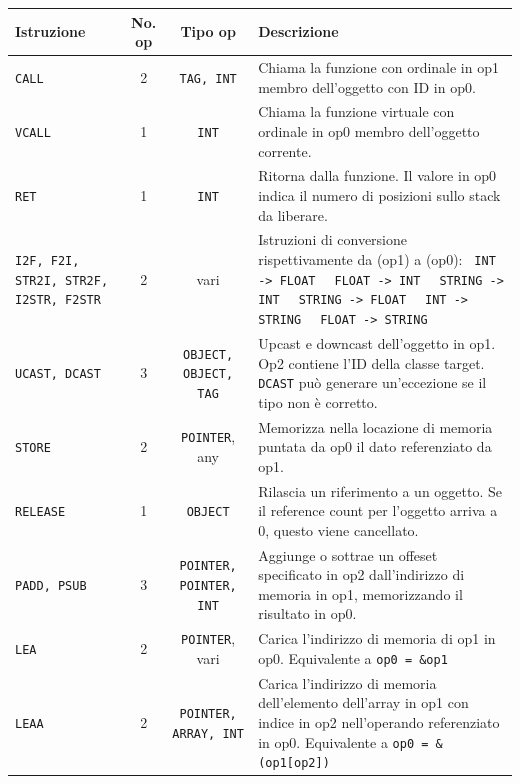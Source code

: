 \documentclass[a4paper, 11pt]{article}
\newcommand{\code}[1]{\scriptsize{\texttt{#1}}\normalsize}
\begin{document}
\begin{center}
\begin{tabular}{p{2.2 cm}|c|c|p{5.5 cm}}
\hline

\textbf{Istruzione} & \textbf{No. op} & \textbf{Tipo op} & \textbf{Descrizione}\\
\hline


\code{CALL} & 2 & \code{TAG, INT} & \footnotesize{Chiama la funzione con ordinale in op1 membro dell'oggetto con ID in op0.}\\
\code{VCALL} & 1 & \code{INT} & \footnotesize{Chiama la funzione virtuale con ordinale in op0 membro dell'oggetto corrente.}\\

\code{RET} & 1 & \code{INT} & \footnotesize{Ritorna dalla funzione. Il valore in op0 indica il numero di posizioni sullo stack da liberare.}\\

\code{I2F, F2I, STR2I, STR2F, I2STR, F2STR} & 2 & vari & \footnotesize{Istruzioni di conversione rispettivamente da (op1) a (op0):
\linebreak \code{ INT -> FLOAT }
\linebreak \code{ FLOAT -> INT }
\linebreak \code{ STRING -> INT }
\linebreak \code{ STRING -> FLOAT }
\linebreak \code{ INT -> STRING }
\linebreak \code{ FLOAT -> STRING }
}\\

\code{UCAST, DCAST} & 3 & \code{OBJECT, OBJECT, TAG} & \footnotesize{Upcast e downcast dell'oggetto in op1. Op2 contiene l'ID della classe target.} \code{DCAST} \footnotesize{pu\`o generare un'eccezione se il tipo non \`e corretto.}\\

\code{STORE} & 2 & \code{POINTER}, any & \footnotesize{Memorizza nella locazione di memoria puntata da op0 il dato referenziato da op1.}\\

\code{RELEASE} & 1 & \code{OBJECT} & \footnotesize{Rilascia un riferimento a un oggetto. Se il reference count per l'oggetto arriva a 0, questo viene cancellato.}\\

\code{PADD, PSUB} & 3 & \code{POINTER, POINTER, INT} & \footnotesize{Aggiunge o sottrae un offeset specificato in op2 dall'indirizzo di memoria in op1, memorizzando il risultato in op0. }\\
\code{LEA} & 2 & \code{POINTER}, vari & \footnotesize{Carica l'indirizzo di memoria di op1 in op0. Equivalente a \code{op0 = \&op1} }\\
\code{LEAA} & 2 & \code{POINTER, ARRAY, INT} & \footnotesize{Carica l'indirizzo di memoria dell'elemento dell'array in op1 con indice in op2 nell'operando referenziato in op0. Equivalente a \code{op0 = \&(op1[op2])} }\\


\end{tabular}
\end{center}
\end{document}
